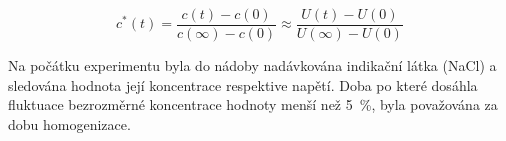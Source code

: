 \begin{equation}
	c^{*}(t) = \frac{c(t) - c(0)}{c(\infty) - c(0)} \approx \frac{U(t) - U(0)}{U(\infty) - U(0)}
	\label{eq:bezkonc}
\end{equation}

Na počátku experimentu byla do nádoby nadávkována indikační látka (NaCl) a sledována hodnota její koncentrace respektive napětí. Doba po které dosáhla fluktuace bezrozměrné koncentrace hodnoty menší než \SI{5}{\percent}, byla považována za dobu homogenizace. 





